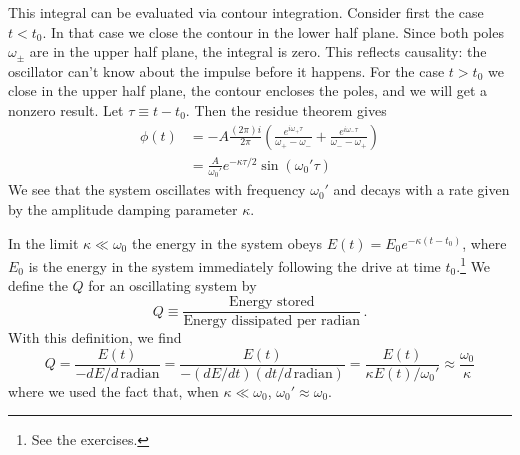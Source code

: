 This integral can be evaluated via contour integration.
Consider first the case $t < t_0$.
In that case we close the contour in the lower half plane.
Since both poles $\omega_\pm$ are in the upper half plane, the integral is zero.
This reflects causality: the oscillator can't know about the impulse before it happens.
For the case $t > t_{0}$ we close in the upper half plane, the contour encloses the poles, and we will get a nonzero result.
Let $\tau \equiv t - t_0$.
Then the residue theorem gives
\begin{align}
  \phi(t) &=
  -A \frac{(2\pi) i }{2 \pi}
  \left(
  \frac{e^{i \omega_+ \tau}}{\omega_+ - \omega_-} +
  \frac{e^{i \omega_- \tau}}{\omega_- - \omega_+}
  \right) \\
  &= \frac{A}{\omega_0'} e^{- \kappa \tau / 2} \sin(\omega_0' \tau)
\end{align}
We see that the system oscillates with frequency $\omega_0'$ and decays with a rate given by the amplitude damping parameter $\kappa$.


In the limit $\kappa \ll \omega_0$ the energy in the system obeys $E(t) = E_0 e^{- \kappa (t - t_0)}$, where $E_0$ is the energy in the system immediately following the drive at time $t_0$.\footnote{See the exercises.}
We define the  $Q$ for an oscillating system by
\begin{equation}
  Q \equiv \frac{\textrm{Energy stored}}{\textrm{Energy dissipated per radian}} \, .
\end{equation}
With this definition, we find
\begin{equation}
  Q
  = \frac{E(t)}{-dE/d\,\textrm{radian}}
  = \frac{E(t)}{-(dE/dt)(dt/d\,\textrm{radian})}
  = \frac{E(t)}{\kappa E(t) / \omega_0'}
  \approx \frac{\omega_0}{\kappa}
\end{equation}
where we used the fact that, when $\kappa \ll \omega_0$, $\omega_0' \approx \omega_0$.

